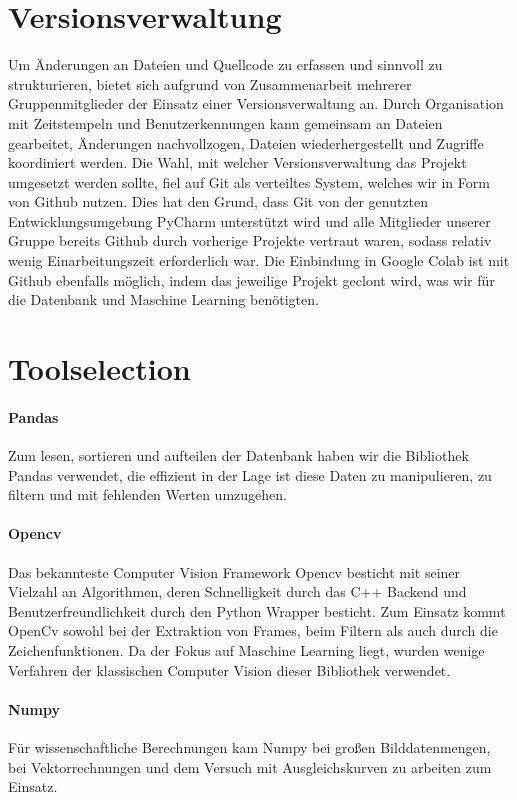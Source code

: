 \section{Versionsverwaltung}
Um Änderungen an Dateien und Quellcode zu erfassen und sinnvoll zu strukturieren, bietet sich aufgrund von Zusammenarbeit mehrerer Gruppenmitglieder der Einsatz einer Versionsverwaltung an. Durch Organisation mit Zeitstempeln und Benutzerkennungen kann gemeinsam an Dateien gearbeitet, Änderungen nachvollzogen, Dateien wiederhergestellt und Zugriffe koordiniert werden. Die Wahl, mit welcher Versionsverwaltung das Projekt umgesetzt werden sollte, fiel auf Git als verteiltes System, welches wir in Form von Github nutzen. Dies hat den Grund, dass Git von der genutzten Entwicklungsumgebung PyCharm unterstützt wird und alle Mitglieder unserer Gruppe bereits Github durch vorherige Projekte vertraut waren, sodass relativ wenig Einarbeitungszeit erforderlich war. Die Einbindung in Google Colab ist mit Github ebenfalls möglich, indem das jeweilige Projekt geclont wird, was wir für die Datenbank und Maschine Learning benötigten.
\section{Toolselection}
\paragraph{Pandas}$~$\\
Zum lesen, sortieren und aufteilen der Datenbank haben wir die Bibliothek Pandas verwendet, die effizient in der Lage ist diese Daten zu manipulieren, zu filtern und mit fehlenden Werten umzugehen.
\paragraph{Opencv}$~$\\
Das bekannteste Computer Vision Framework Opencv besticht mit seiner Vielzahl an Algorithmen, deren Schnelligkeit durch das C++ Backend und Benutzerfreundlichkeit durch den Python Wrapper besticht. Zum Einsatz kommt OpenCv sowohl bei der Extraktion von Frames, beim Filtern als auch durch die Zeichenfunktionen. Da der Fokus auf Maschine Learning liegt, wurden wenige Verfahren der klassischen Computer Vision dieser Bibliothek verwendet.
\paragraph{Numpy}$~$\\
Für wissenschaftliche Berechnungen kam Numpy bei großen Bilddatenmengen, bei Vektorrechnungen und dem Versuch mit Ausgleichskurven zu arbeiten zum Einsatz.
